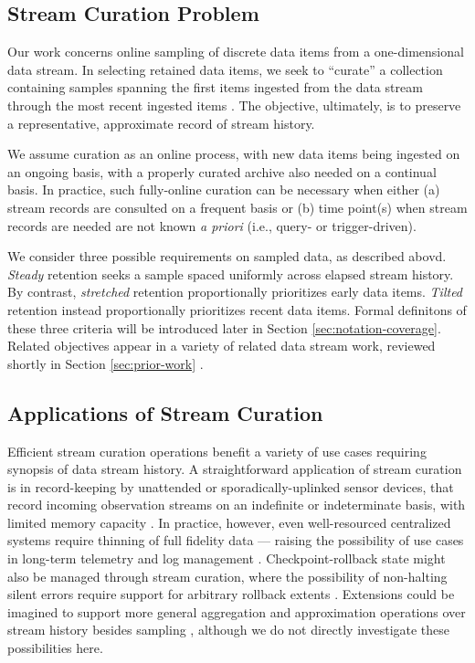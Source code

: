 \subsection{Stream Curation Problem}

Our work concerns online sampling of discrete data items from a one-dimensional data stream.
In selecting retained data items, we seek to ``curate'' a collection containing samples spanning the first items ingested from the data stream through the most recent ingested items \citep{moreno2024algorithms}.
The objective, ultimately, is to preserve a representative, approximate record of stream history.

We assume curation as an online process, with new data items being ingested on an ongoing basis, with a properly curated archive also needed on a continual basis.
In practice, such fully-online curation can be necessary when either (a) stream records are consulted on a frequent basis or (b) time point(s) when stream records are needed are not known \textit{a priori} (i.e., query- or trigger-driven).

We consider three possible requirements on sampled data, as described abovd.
\textit{{Steady}} retention seeks a sample spaced uniformly across elapsed stream  history.
By contrast, \textit{{stretched}} retention proportionally prioritizes early data items.
\textit{{Tilted}} retention instead proportionally prioritizes recent data items.
Formal definitons of these three criteria will be introduced later in Section \ref{sec:notation-coverage}.
Related objectives appear in a variety of related data stream work, reviewed shortly in Section \ref{sec:prior-work} \citep{aggarwal2003framework,han2005stream}.


\subsection{Applications of Stream Curation}

Efficient stream curation operations benefit a variety of use cases requiring synopsis of data stream history.
A straightforward application of stream curation is in record-keeping by unattended or sporadically-uplinked sensor devices, that record incoming observation streams on an indefinite or indeterminate basis, with limited memory capacity \citep{jain2022survey}.
In practice, however, even well-resourced centralized systems require thinning of full fidelity data --- raising the possibility of use cases in long-term telemetry and log management \citep{kent2006guide,miebach2002hubble}.
Checkpoint-rollback state might also be managed through stream curation, where the possibility of non-halting silent errors require support for arbitrary rollback extents \citep{aupy2013combination}.
Extensions could be imagined to support more general aggregation and approximation operations over stream history besides sampling \citep{schoellhammer2024lightweight}, although we do not directly investigate these possibilities here.


